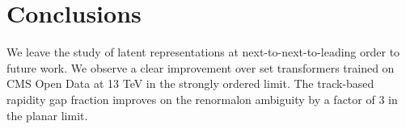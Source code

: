 \section{Conclusions}\label{sec:conclusions}

We leave the study of latent representations at next-to-next-to-leading
order to future work. We observe a clear improvement over set
transformers trained on CMS Open Data at 13 TeV in the strongly ordered
limit. The track-based rapidity gap fraction improves on the renormalon
ambiguity by a factor of 3 in the planar limit.

